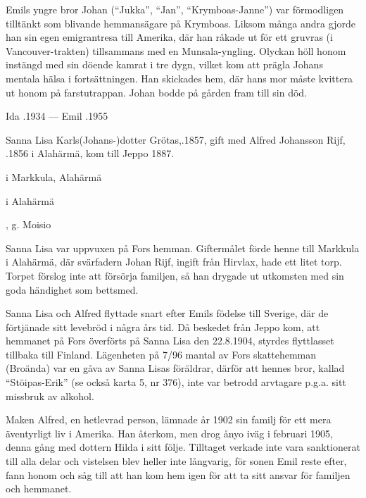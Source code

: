 Emils yngre bror Johan (``Jukka'', ``Jan'', ``Krymboas-Janne'') var	förmodligen tilltänkt som blivande hemmansägare på Krymboas. Liksom många andra gjorde han sin egen emigrantresa till Amerika, där han råkade ut för ett gruvras (i Vancouver-trakten) tillsammans med en Munsala-yngling. Olyckan höll honom instängd med sin döende kamrat i tre dygn, vilket kom att prägla Johans mentala hälsa i fortsättningen. Han skickades hem, där hans mor måste kvittera ut honom på farstutrappan. Johan bodde på gården fram till sin död.

Ida .1934  ---	 Emil .1955


Sanna Lisa Karls(Johans-)dotter Grötas,.1857, gift med Alfred Johansson Rijf, .1856 i Alahärmä, kom till Jeppo 1887.
\begin{jhchildren}
  \item {} i Markkula, Alahärmä
  \item {} i Alahärmä
  \item {}, g. Moisio
  \item {}
\end{jhchildren}
Sanna Lisa var uppvuxen på Fors hemman. Giftermålet förde henne till Markkula i Alahärmä, där svärfadern Johan Rijf, ingift från Hirvlax, hade ett litet torp. Torpet förslog inte att försörja familjen, så han drygade ut utkomsten med sin goda händighet som bettsmed.

Sanna Lisa och Alfred flyttade snart efter Emils födelse till Sverige, där de förtjänade sitt levebröd i några års tid. Då  beskedet från Jeppo kom, att hemmanet på Fors överförts på Sanna Lisa den 22.8.1904, styrdes flyttlasset tillbaka till Finland. Lägenheten på 7/96 mantal av Fors skattehemman (Broända) var en gåva av Sanna Lisas föräldrar, därför att hennes bror, kallad ``Stöipas-Erik'' (se också karta 5, nr 376), inte var betrodd arvtagare p.g.a. sitt missbruk av alkohol.

Maken Alfred, en hetlevrad person, lämnade år 1902 sin familj för ett mera äventyrligt liv i Amerika. Han återkom, men drog ånyo iväg i	februari 1905, denna gång med dottern Hilda i sitt följe. Tilltaget	verkade inte vara sanktionerat till alla delar och vistelsen blev heller	inte långvarig, för sonen Emil reste efter, fann honom och såg till att	han kom hem igen för att ta sitt ansvar för familjen och hemmanet.


